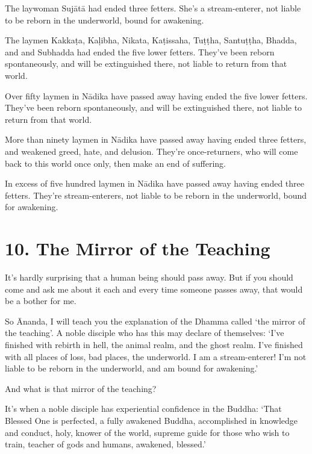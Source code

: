 \documentclass[12pt,openany]{book}%
\begin{document}
The laywoman \textsanskrit{Sujātā} had ended three fetters. She’s a stream-enterer, not liable to be reborn in the underworld, bound for awakening. 

The laymen \textsanskrit{Kakkaṭa}, \textsanskrit{Kaḷibha}, Nikata, \textsanskrit{Kaṭissaha}, \textsanskrit{Tuṭṭha}, \textsanskrit{Santuṭṭha}, Bhadda, and and Subhadda had ended the five lower fetters. They’ve been reborn spontaneously, and will be extinguished there, not liable to return from that world. 

Over fifty laymen in \textsanskrit{Nādika} have passed away having ended the five lower fetters. They’ve been reborn spontaneously, and will be extinguished there, not liable to return from that world. 

More than ninety laymen in \textsanskrit{Nādika} have passed away having ended three fetters, and weakened greed, hate, and delusion. They’re once-returners, who will come back to this world once only, then make an end of suffering. 

In excess of five hundred laymen in \textsanskrit{Nādika} have passed away having ended three fetters. They’re stream-enterers, not liable to be reborn in the underworld, bound for awakening. 

\section*{10. The Mirror of the Teaching }

It’s hardly surprising that a human being should pass away. But if you should come and ask me about it each and every time someone passes away, that would be a bother for me. 

So Ānanda, I will teach you the explanation of the Dhamma called ‘the mirror of the teaching’. A noble disciple who has this may declare of themselves: ‘I’ve finished with rebirth in hell, the animal realm, and the ghost realm. I’ve finished with all places of loss, bad places, the underworld. I am a stream-enterer! I’m not liable to be reborn in the underworld, and am bound for awakening.’ 

And what is that mirror of the teaching? 

It’s when a noble disciple has experiential confidence in the Buddha: ‘That Blessed One is perfected, a fully awakened Buddha, accomplished in knowledge and conduct, holy, knower of the world, supreme guide for those who wish to train, teacher of gods and humans, awakened, blessed.’ 
\end{document}
